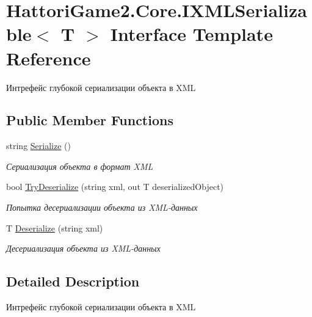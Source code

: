 \hypertarget{interface_hattori_game2_1_1_core_1_1_i_x_m_l_serializable}{}\section{Hattori\+Game2.\+Core.\+I\+X\+M\+L\+Serializable$<$ T $>$ Interface Template Reference}
\label{interface_hattori_game2_1_1_core_1_1_i_x_m_l_serializable}


Интрефейс глубокой сериализации объекта в X\+M\+L  


\subsection*{Public Member Functions}
\begin{DoxyCompactItemize}
\item 
string \hyperlink{interface_hattori_game2_1_1_core_1_1_i_x_m_l_serializable_a5f812f3de37013757bf9d7e8ff115a03_a5f812f3de37013757bf9d7e8ff115a03}{Serialize} ()
\begin{DoxyCompactList}\small\item\em Сериализация объекта в формат X\+M\+L \end{DoxyCompactList}\item 
bool \hyperlink{interface_hattori_game2_1_1_core_1_1_i_x_m_l_serializable_a25ffdca257af050aaa10003adbfb82f7_a25ffdca257af050aaa10003adbfb82f7}{Try\+Deserialize} (string xml, out T deserialized\+Object)
\begin{DoxyCompactList}\small\item\em Попытка десериализации объекта из X\+M\+L-\/данных \end{DoxyCompactList}\item 
T \hyperlink{interface_hattori_game2_1_1_core_1_1_i_x_m_l_serializable_a5723f1b75e6da1a0538324b68f8d1b41_a5723f1b75e6da1a0538324b68f8d1b41}{Deserialize} (string xml)
\begin{DoxyCompactList}\small\item\em Десериализация объекта из X\+M\+L-\/данных \end{DoxyCompactList}\end{DoxyCompactItemize}


\subsection{Detailed Description}
Интрефейс глубокой сериализации объекта в X\+M\+L 

